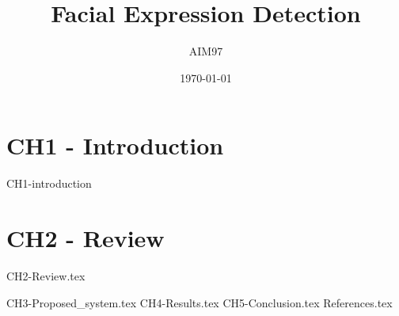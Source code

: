 \documentclass[a4paper]{book}
\title{Facial Expression Detection}
\author{AIM97}
\date{\today}
\begin{document}
	\maketitle
	\tableofcontents
	
	\chapter{CH1 - Introduction}
	{CH1-introduction}
	
	\chapter{CH2 - Review}
	{CH2-Review.tex}
	
	{CH3-Proposed_system.tex}
	{CH4-Results.tex}
	{CH5-Conclusion.tex}
	{References.tex}
	
\end{document}

